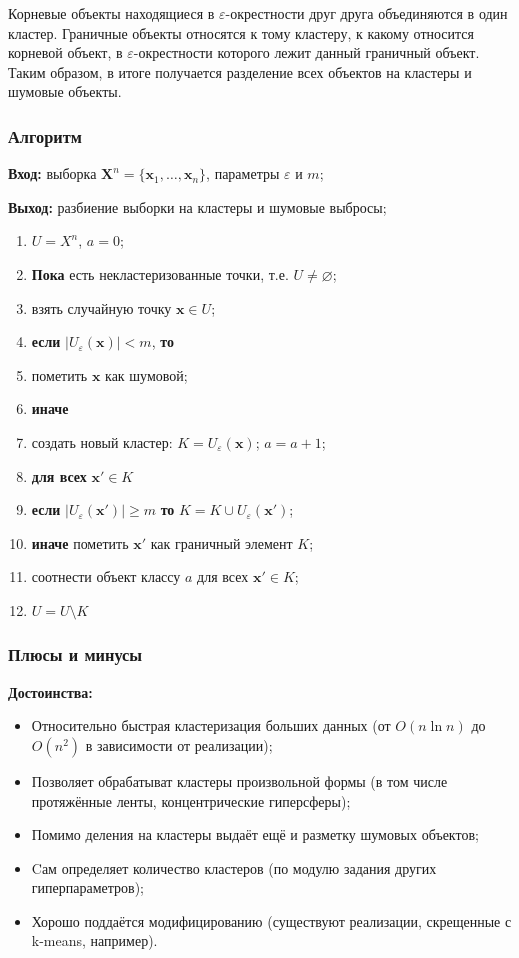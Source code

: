 \documentclass[10pt]{article}
\renewcommand{\geq}{\geqslant}
\newcommand{\eps}{\varepsilon}
\begin{document}
Корневые объекты находящиеся в $\eps$-окрестности друг друга объединяются в один кластер. Граничные объекты относятся к тому кластеру, к какому относится корневой
объект, в $\eps$-окрестности которого лежит данный граничный объект. Таким образом, в итоге получается разделение всех объектов на кластеры и шумовые объекты.

\subsubsection*{Алгоритм}
	
\textbf{Вход:} выборка $\pmb X^{n} = \{\pmb x_1, \dots, \pmb x_{n}\}$, параметры $\varepsilon$ и $m$;
	
\textbf{Выход:} разбиение выборки на кластеры и шумовые выбросы;
\begin{enumerate}
		\item $U=X^n$, $a=0$; 
		\item \textbf{Пока} есть некластеризованные точки, т.е. $U \neq \varnothing$; 
		\item \quad взять случайную точку $\pmb x \in U$; 
		\item \quad \textbf{если} $|U_\varepsilon (\pmb x)| < m$, \textbf{то} 
		\item \quad \quad пометить $\pmb x$ как шумовой; 
		\item \quad \textbf{иначе} 
		\item \quad \quad создать новый кластер: $K=U_\varepsilon (\pmb x)$; $a = a + 1$; 
		\item \quad \quad \textbf{для всех} $\pmb x' \in K$ 
		\item \quad \quad \quad \textbf{если} $|U_\varepsilon (\pmb x')| \geq m$ \textbf{то} $K=K \cup U_\varepsilon(\pmb x')$; 
		\item \quad \quad \quad \textbf{иначе} пометить $\pmb x'$ как граничный элемент $K$; 
		\item \quad \quad соотнести объект классу $a$ для всех $\pmb x' \in K$; 
		\item \quad \quad $U=U \setminus K$ 
\end{enumerate}

\subsubsection*{Плюсы и минусы}
\textbf{Достоинства:} 
\begin{itemize}
	\item Относительно быстрая кластеризация больших данных (от $O(n \ln n)$ до $O(n^2)$ в зависимости от реализации); 
	\item Позволяет обрабатыват кластеры произвольной формы (в том числе протяжённые ленты, концентрические гиперсферы); 
	\item Помимо деления на кластеры выдаёт ещё и разметку шумовых объектов; 
	\item Cам определяет количество кластеров (по модулю задания других гиперпараметров);
	\item Хорошо поддаётся модифицированию (существуют реализации, скрещенные с k-means, например). 
\end{itemize}
\end{document}
